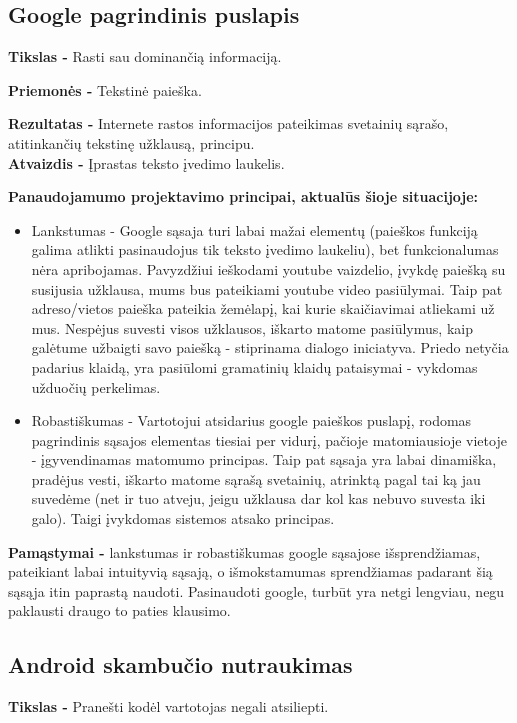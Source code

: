 ﻿\documentclass[a4paper, 12pt]{article}
\begin{document}
	\subsection{Google pagrindinis puslapis}
		\textbf{Tikslas -}
		Rasti sau dominančią informaciją.

		\textbf{Priemonės -}
		Tekstinė paieška.
		
		\textbf{Rezultatas -}
		Internete rastos informacijos pateikimas svetainių sąrašo, atitinkančių tekstinę užklausą, principu.\\
		
		\textbf{Atvaizdis -}
		Įprastas teksto įvedimo laukelis.

		\textbf{Panaudojamumo projektavimo principai, aktualūs šioje situacijoje:}
		\begin{itemize}
		\item Lankstumas - Google sąsaja turi labai mažai elementų (paieškos funkciją galima atlikti pasinaudojus tik teksto įvedimo laukeliu), bet funkcionalumas nėra apribojamas.
		Pavyzdžiui ieškodami youtube vaizdelio, įvykdę paiešką su susijusia užklausa, mums bus pateikiami youtube video pasiūlymai.
		Taip pat adreso/vietos paieška pateikia žemėlapį, kai kurie skaičiavimai atliekami už mus.
		Nespėjus suvesti visos užklausos, iškarto matome pasiūlymus, kaip galėtume užbaigti savo paiešką - stiprinama dialogo iniciatyva.
		Priedo netyčia padarius klaidą, yra pasiūlomi gramatinių klaidų pataisymai - vykdomas užduočių perkelimas.
		\item Robastiškumas - Vartotojui atsidarius google paieškos puslapį, rodomas pagrindinis sąsajos elementas tiesiai per vidurį, pačioje matomiausioje vietoje - įgyvendinamas matomumo principas.
		Taip pat sąsaja yra labai dinamiška, pradėjus vesti, iškarto matome sąrašą svetainių, atrinktą pagal tai ką jau suvedėme (net ir tuo atveju, jeigu užklausa dar kol kas nebuvo suvesta iki galo).
		Taigi įvykdomas sistemos atsako principas.
		\end{itemize}

		\textbf{Pamąstymai -}
		lankstumas ir robastiškumas google sąsajose išsprendžiamas, pateikiant labai intuityvią sąsają, o išmokstamumas sprendžiamas padarant šią sąsąja itin paprastą naudoti.
		Pasinaudoti google, turbūt yra netgi lengviau, negu paklausti draugo to paties klausimo.

	\subsection{Android skambučio nutraukimas}
		\textbf{Tikslas -}
		Pranešti kodėl vartotojas negali atsiliepti.
\end{document}
